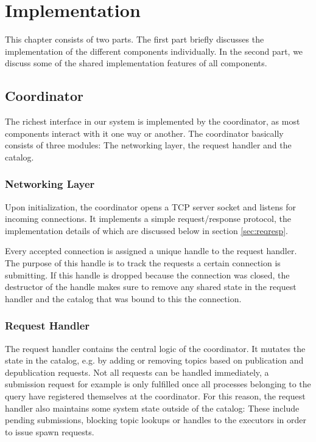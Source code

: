 \chapter{Implementation}\label{ch:impl}

This chapter consists of two parts. The first part
briefly discusses the implementation of the different components individually.
In the second part, we discuss some of the shared implementation features
of all components.

\section{Coordinator}

The richest interface in our system is implemented by the coordinator, as most
components interact with it one way or another. The coordinator basically
consists of three modules: The networking layer, the request handler and
the catalog.

\subsection{Networking Layer}

Upon initialization, the coordinator opens a TCP server socket and listens
for incoming connections. It implements a simple request/response protocol, the
implementation details of which are discussed below in section \ref{sec:reqresp}.

Every accepted connection is assigned a unique handle to the request handler.
The purpose of this handle is to track the requests a certain connection is
submitting. If this handle is dropped because the connection was closed, the
destructor of the handle makes sure to remove any shared state in the request
handler and the catalog that was bound to this the connection.

\subsection{Request Handler}

The request handler contains the central logic of the coordinator. It mutates
the state in the catalog, e.g. by adding or removing topics based on publication
and depublication requests. Not all requests can be handled immediately, a
submission request for example is only fulfilled once all processes belonging
to the query have registered themselves at the coordinator. For this reason,
the request handler also maintains some system state outside of the catalog:
These include pending submissions, blocking topic lookups or handles to the
executors in order to issue spawn requests.

